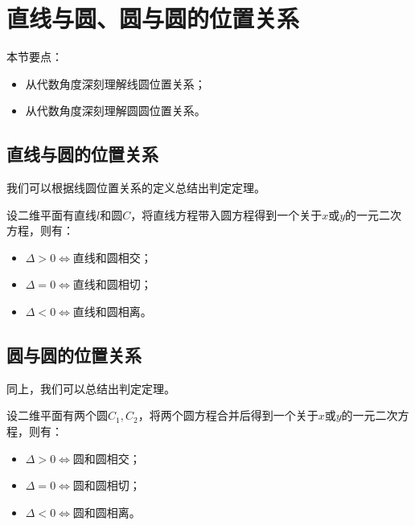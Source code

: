 \section{直线与圆、圆与圆的位置关系}

本节要点：
\begin{itemize}
    \item 从代数角度深刻理解线圆位置关系；
    \item 从代数角度深刻理解圆圆位置关系。
\end{itemize}

\subsection{直线与圆的位置关系}

我们可以根据线圆位置关系的定义总结出判定定理。

\begin{theorem}
设二维平面有直线$l$和圆$C$，将直线方程带入圆方程得到一个关于$x$或$y$的一元二次方程，则有：
\begin{itemize}
    \item $\varDelta >0\Leftrightarrow \text{直线和圆相交}$；
    \item $\varDelta =0\Leftrightarrow \text{直线和圆相切}$；
    \item $\varDelta <0\Leftrightarrow \text{直线和圆相离}$。
\end{itemize}
\end{theorem}

\subsection{圆与圆的位置关系}

同上，我们可以总结出判定定理。

\begin{theorem}
设二维平面有两个圆$C_1,C_2$，将两个圆方程合并后得到一个关于$x$或$y$的一元二次方程，则有：
\begin{itemize}
    \item $\varDelta >0\Leftrightarrow \text{圆和圆相交}$；
    \item $\varDelta =0\Leftrightarrow \text{圆和圆相切}$；
    \item $\varDelta <0\Leftrightarrow \text{圆和圆相离}$。
\end{itemize}
\end{theorem}

